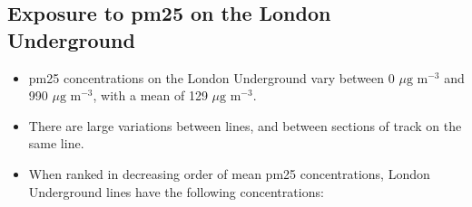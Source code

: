 \subsection{Exposure to \texorpdfstring{\gls{pm25}}{} on the London Underground}
\label{subsec:wrapup_conc_underground}

\begin{itemize}
    \item \gls{pm25} concentrations on the London Underground vary between 0 $\mu \text{g m}^{-3}$ and 990 $\mu \text{g m}^{-3}$, with a mean of 129 $\mu \text{g m}^{-3}$.
    \item There are large variations between lines, and between sections of track on the same line.
    \item When ranked in decreasing order of mean \gls{pm25} concentrations, London Underground lines have the following concentrations:
\end{itemize}


